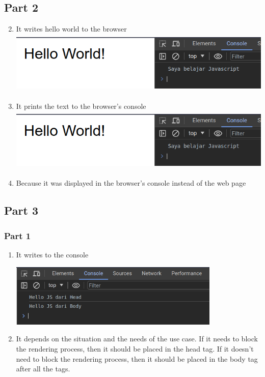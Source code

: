 \documentclass[12pt,titlepage]{article}
\begin{document}
\subsection{Part 2}
\begin{enumerate}
    \setcounter{enumi}{1}
    \item {
        It writes hello world to the browser\\
        \includegraphics[height=3cm]{./images/p2-n1.png}
    }
    \item {
        It prints the text to the browser's console\\
        \includegraphics[height=3cm]{./images/p2-n1.png}
    }
    \item {
        Because it was displayed in the browser's console instead of the web page
    }
\end{enumerate}

\subsection{Part 3}
\subsubsection{Part 1}
\begin{enumerate}
    \item {
        It writes to the console

        \includegraphics[height=3cm]{./images/p3-n1.png}
    }
    \item {
        It depends on the situation and the needs of the use case.
        If it needs to block the rendering process, then it should be placed in the head tag.
        If it doesn't need to block the rendering process, then it should be placed in the body tag after all the tags.
    }
\end{enumerate}
\end{document}
